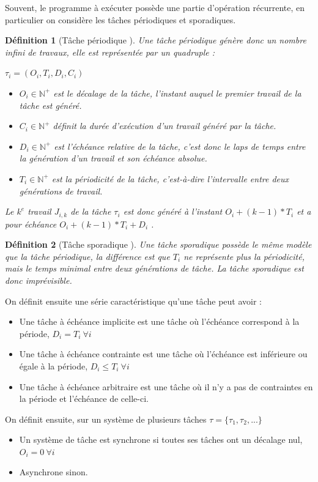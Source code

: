 \documentclass[12pt,a4paper,oneside]{book}
\theoremstyle{break}
\newtheorem{defin}{Définition}[chapter]
\theoremstyle{breakplain}
\begin{document}
Souvent, le programme à exécuter possède une partie d'opération récurrente, en particulier on considère les tâches périodiques et sporadiques.

\begin{defin}[Tâche périodique \cite{goossens1999scheduling}]
Une tâche périodique génère donc un nombre infini de travaux, elle est représentée par un quadruple :
\begin{center}
$\tau_i = (O_i, T_i, D_i, C_i)$
\end{center}
\begin{itemize}
\item $O_i \in \mathbb{N}^{+}$ est le décalage de la tâche, l'instant auquel le premier travail de la tâche est généré.
\item $C_i \in \mathbb{N}^{+}$ définit la durée d'exécution d'un travail généré par la tâche.
\item $D_i \in \mathbb{N}^{+}$ est l'échéance relative de la tâche, c'est donc le laps de temps entre la génération d'un travail et son échéance absolue.
\item $T_i \in \mathbb{N}^{+}$ est la périodicité de la tâche, c'est-à-dire l'intervalle entre deux générations de travail.\\
\end{itemize}
Le $k^{e}$ travail $J_{i,k}$ de la tâche $\tau_i$ est donc généré à l'instant $O_i + (k-1)*T_i$ et a pour échéance  $O_i+(k-1)*T_i+D_i$ .
\end{defin}
\begin{defin}[Tâche sporadique \cite{goossens1999scheduling}]
Une tâche sporadique possède le même modèle que la tâche périodique, la différence est que $T_i$ ne représente plus la périodicité, mais le temps minimal entre deux générations de tâche. La tâche sporadique est donc imprévisible.
\end{defin}


On définit ensuite une série caractéristique \cite{goossens1999scheduling} qu'une tâche peut avoir :
\begin{itemize}
\item Une tâche à échéance implicite est une tâche où l'échéance correspond à la période, $D_i = T_i\ \forall i$
\item Une tâche à échéance contrainte est une tâche où l'échéance est inférieure ou égale à la période, $D_i \le T_i\ \forall i$
\item Une tâche à échéance arbitraire est une tâche où il n'y a pas de contraintes en la période et l'échéance de celle-ci.
\end{itemize}
On définit ensuite, sur un système de plusieurs tâches $\tau = \{\tau_1, \tau_2, ...\}$
\begin{itemize}
\item Un système de tâche est synchrone si toutes ses tâches ont un décalage nul, $O_i = 0\ \forall i$
\item Asynchrone sinon.
\end{itemize}
\end{document}
